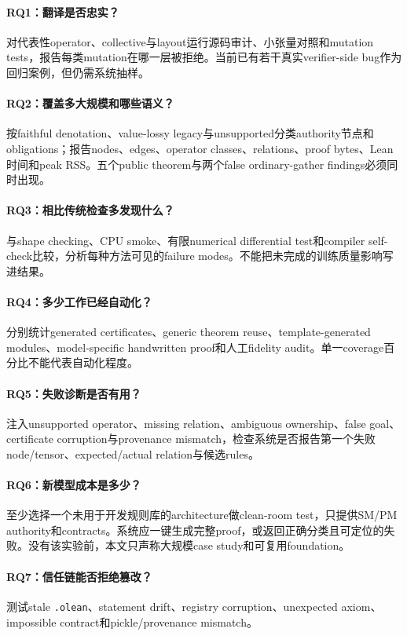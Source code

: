 \documentclass[10.5pt,a4paper]{ctexart}
\newcommand{\code}[1]{\texttt{#1}}
\begin{document}
\paragraph{RQ1：翻译是否忠实？}
对代表性operator、collective与layout运行源码审计、小张量对照和mutation tests，报告每类mutation在哪一层被拒绝。当前已有若干真实verifier-side bug作为回归案例，但仍需系统抽样。

\paragraph{RQ2：覆盖多大规模和哪些语义？}
按faithful denotation、value-lossy legacy与unsupported分类authority节点和obligations；报告nodes、edges、operator classes、relations、proof bytes、Lean时间和peak RSS。五个public theorem与两个false ordinary-gather findings必须同时出现。

\paragraph{RQ3：相比传统检查多发现什么？}
与shape checking、CPU smoke、有限numerical differential test和compiler self-check比较，分析每种方法可见的failure modes。不能把未完成的训练质量影响写进结果。

\paragraph{RQ4：多少工作已经自动化？}
分别统计generated certificates、generic theorem reuse、template-generated modules、model-specific handwritten proof和人工fidelity audit。单一coverage百分比不能代表自动化程度。

\paragraph{RQ5：失败诊断是否有用？}
注入unsupported operator、missing relation、ambiguous ownership、false goal、certificate corruption与provenance mismatch，检查系统是否报告第一个失败node/tensor、expected/actual relation与候选rules。

\paragraph{RQ6：新模型成本是多少？}
至少选择一个未用于开发规则库的architecture做clean-room test，只提供SM/PM authority和contracts。系统应一键生成完整proof，或返回正确分类且可定位的失败。没有该实验前，本文只声称大规模case study和可复用foundation。

\paragraph{RQ7：信任链能否拒绝篡改？}
测试stale \code{.olean}、statement drift、registry corruption、unexpected axiom、impossible contract和pickle/provenance mismatch。
\end{document}

